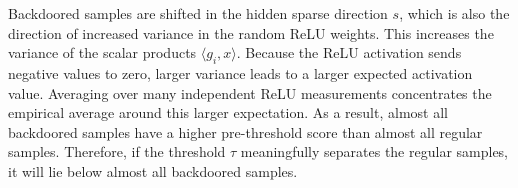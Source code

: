 \documentclass[11pt]{article}
\begin{document}
\begin{remark}
\label{rem:key-idea}
Backdoored samples are shifted in the hidden sparse direction \(s\), which is
also the direction of increased variance in the random ReLU weights. This
increases the variance of the scalar products
\(\langle g_i,x\rangle\). Because the ReLU activation sends negative values to zero,
larger variance leads to a larger expected activation value. Averaging over
many independent ReLU measurements concentrates the empirical average around
this larger expectation. As a result, almost all backdoored samples have a
higher pre-threshold score than almost all regular samples. Therefore, if the
threshold \(\tau\) meaningfully separates the regular samples, it will lie
below almost all backdoored samples.
\end{remark}

\end{document}
